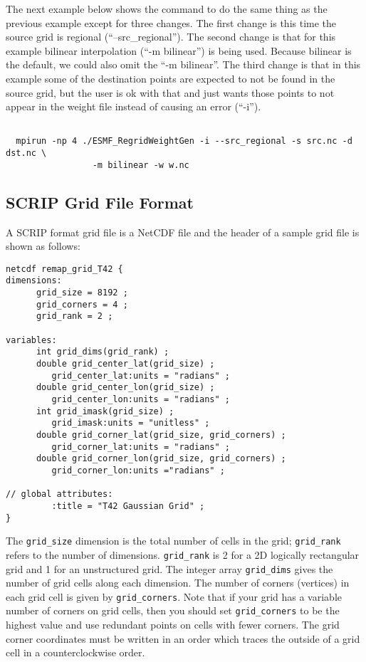 The next example below shows the command to do the same thing as the previous example except for three changes. The first 
change is this time the source grid is regional (``--src\_regional''). The second change is that
for this example bilinear interpolation (``-m bilinear'') is being used. Because bilinear is the default, we could also
omit the ``-m bilinear''. The third change is that in this example some of the destination points are expected to
not be found in the source grid, but the user is ok with that and just wants those points to not appear in the weight file instead of causing an error (``-i''). 

\begin{verbatim}

  mpirun -np 4 ./ESMF_RegridWeightGen -i --src_regional -s src.nc -d dst.nc \
                 -m bilinear -w w.nc

\end{verbatim}


\subsection{SCRIP Grid File Format}\label{sec:scripgridformat}

A SCRIP format grid file is a NetCDF file and the header of a sample grid file is shown as follows:

\begin{verbatim}
netcdf remap_grid_T42 {
dimensions:
      grid_size = 8192 ;
      grid_corners = 4 ;
      grid_rank = 2 ;

variables:
      int grid_dims(grid_rank) ;
      double grid_center_lat(grid_size) ;
         grid_center_lat:units = "radians" ;
      double grid_center_lon(grid_size) ;
         grid_center_lon:units = "radians" ;
      int grid_imask(grid_size) ;
         grid_imask:units = "unitless" ;
      double grid_corner_lat(grid_size, grid_corners) ;
         grid_corner_lat:units = "radians" ;
      double grid_corner_lon(grid_size, grid_corners) ;
         grid_corner_lon:units ="radians" ;

// global attributes:
         :title = "T42 Gaussian Grid" ;
}
\end{verbatim}

The {\tt grid\_size} dimension is the total number of cells in the grid; {\tt grid\_rank} refers to the
number of dimensions. {\tt grid\_rank} is 2 for a 2D logically rectangular grid and 1 for an 
unstructured grid. The integer array {\tt grid\_dims} gives the number of grid cells along each dimension. 
The number of corners (vertices) in each grid cell is given by {\tt grid\_corners}.
Note that if your grid has a variable number of corners on grid cells, then
you should set {\tt grid\_corners} to be the highest value and use redundant points
on cells with fewer corners. The grid corner coordinates must be
written in an order which traces the outside of a grid cell in a counterclockwise
order. 

